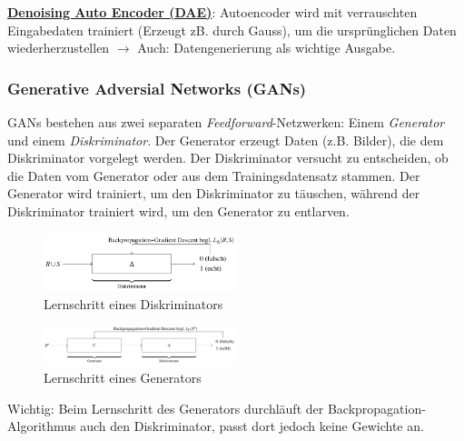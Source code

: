 \underline{\textbf{Denoising Auto Encoder (DAE)}}: Autoencoder wird mit verrauschten Eingabedaten trainiert (Erzeugt zB. durch Gauss), um die ursprünglichen Daten wiederherzustellen $\rightarrow$ Auch: Datengenerierung als wichtige Ausgabe.\\


\subsubsection{Generative Adversial Networks (GANs)}

GANs bestehen aus zwei separaten \emph{Feedforward}-Netzwerken: Einem \emph{Generator} und einem \emph{Diskriminator}. Der Generator erzeugt Daten (z.B. Bilder), die dem Diskriminator vorgelegt werden. Der Diskriminator versucht zu entscheiden, ob die Daten vom Generator oder aus dem Trainingsdatensatz stammen. Der Generator wird trainiert, um den Diskriminator zu täuschen, während der Diskriminator trainiert wird, um den Generator zu entlarven.\\

\begin{figure}[H]
    \centering
    \includegraphics[width=0.5\textwidth]{deepLearning/discriminator.png}
    \caption{Lernschritt eines Diskriminators}
\end{figure}

\begin{figure}[H]
    \centering
    \includegraphics[width=0.5\textwidth]{deepLearning/generator.png}
    \caption{Lernschritt eines Generators}
\end{figure}

Wichtig: Beim Lernschritt des Generators durchläuft der Backpropagation-Algorithmus auch den Diskriminator, passt dort jedoch keine Gewichte an.\\